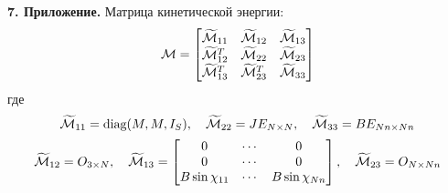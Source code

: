 {\bf 7. Приложение.}
Матрица кинетической энергии:
$$
\mathcal{M} = \begin{bmatrix}
    \widetilde{\mathcal{M}}_{11}   & \widetilde{\mathcal{M}}_{12}   & \widetilde{\mathcal{M}}_{13} \\
    \widetilde{\mathcal{M}}_{12}^T & \widetilde{\mathcal{M}}_{22}   & \widetilde{\mathcal{M}}_{23} \\
    \widetilde{\mathcal{M}}_{13}^T & \widetilde{\mathcal{M}}_{23}^T & \widetilde{\mathcal{M}}_{33} \\
\end{bmatrix}
$$
где
$$
\widetilde{\mathcal{M}}_{11} = \text{diag}(M, M, I_S),
\quad
\widetilde{\mathcal{M}}_{22} = JE_{N \times N},
\quad
\widetilde{\mathcal{M}}_{33} = BE_{Nn \times Nn}
$$
$$
\widetilde{\M}_{12} = O_{3 \times N},
\quad
\widetilde{\M}_{13} = \begin{bmatrix}
        0                      & \cdots & 0                      \\
        0                      & \cdots & 0                      \\
        B\sin\chi_{11}         & \cdots & B\sin\chi_{Nn}         \\
    \end{bmatrix},
\quad
\widetilde{\M}_{23} = O_{N \times Nn}
\vsp
$$
